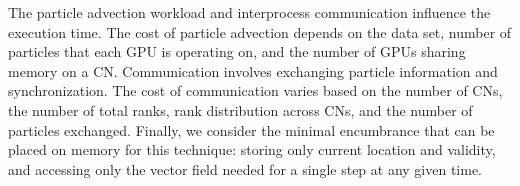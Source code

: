 %
The particle advection workload and interprocess communication influence the execution time.
%
%
The cost of particle advection depends on the data set, number of particles that each GPU is operating on, and the number of GPUs sharing memory on a CN.
%
Communication involves exchanging particle information and synchronization. 
%
The cost of communication varies based on the number of CNs, the number of total ranks, rank distribution across CNs, and the number of particles exchanged.
%
Finally, we consider the minimal encumbrance that can be placed on memory for this technique: storing only current location and validity, and accessing only the vector field needed for a single step at any given time.
%
%
